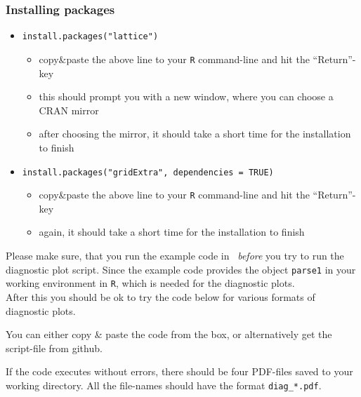 \documentclass[
draft=false,
toc=graduated,
listof=totoc,
headsepline=true,
]%
{scrartcl}
\begin{document}
\subsubsection*{Installing packages}
\begin{itemize}
\item \texttt{install.packages("lattice")}
\begin{itemize}
\item copy\&paste the above line to your \texttt{R} command-line and hit the \enquote{Return}-key
\item this should prompt you with a new window, where you can choose a CRAN mirror
\item after choosing the mirror, it should take a short time for the installation to finish
\end{itemize}
\item \texttt{install.packages("gridExtra", dependencies = TRUE)}
\begin{itemize}
\item copy\&paste the above line to your \texttt{R} command-line and hit the \enquote{Return}-key
\item again, it should take a short time for the installation to finish
\end{itemize}
\end{itemize}
Please make sure, that you run the example code in~ \emph{before} you try to run the diagnostic plot script. Since the example code provides the object \texttt{parse1} in your working environment in \texttt{R}, which is needed for the diagnostic plots.\\
After this you should be ok to try the code below for various formats of diagnostic plots.
\newpage

You can either copy \& paste the code from the box, or alternatively get the script-file from github.\par
If the code executes without errors, there should be four PDF-files saved to your working directory. All the file-names should have the format \texttt{diag\_*.pdf}.
\end{document}
